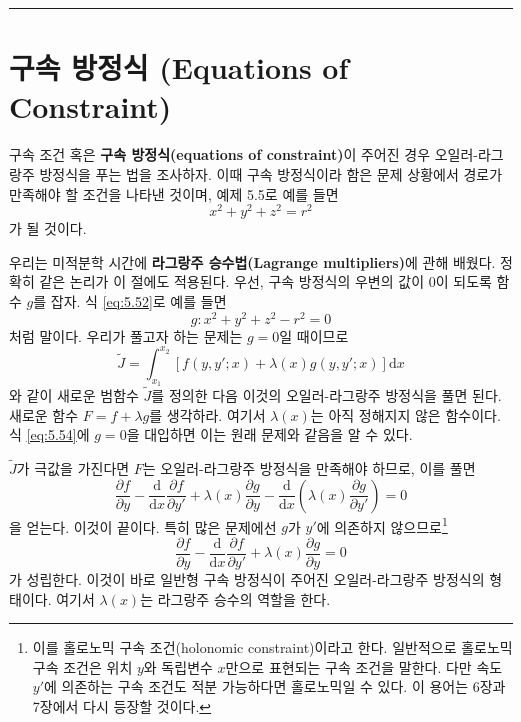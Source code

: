\documentclass[chapter, oneside, b5paper]{oblivoir}
\theoremstyle{plain}
\theoremstyle{definition}
\theoremstyle{remark}
\begin{document}
\noindent\rule{\textwidth}{0.8pt} %
\vspace{1em} %

\section{구속 방정식 (Equations of Constraint)}
구속 조건 혹은 \textbf{구속 방정식(equations of constraint)}이 주어진 경우 오일러-라그랑주 방정식을 푸는 법을 조사하자. 이때 구속 방정식이라 함은 문제 상황에서 경로가 만족해야 할 조건을 나타낸 것이며, 예제 5.5로 예를 들면
\begin{equation}
    x^2 + y^2+z^2 = r^2
    \label{eq:5.52}
\end{equation}
가 될 것이다.

우리는 미적분학 시간에 \textbf{라그랑주 승수법(Lagrange multipliers)}에 관해 배웠다. 정확히 같은 논리가 이 절에도 적용된다. 우선, 구속 방정식의 우변의 값이 0이 되도록 함수 $g$를 잡자. 식 \ref{eq:5.52}로 예를 들면
\begin{equation}
    g : x^2 + y^2 + z^2 - r^2 = 0
\end{equation}
처럼 말이다. 우리가 풀고자 하는 문제는 $g=0$일 때이므로 
\begin{equation}
    \tilde{J} = \int_{x_1}^{x_2} [f(y, y' ;x) + \lambda(x)g(y, y' ;x)] \mathrm{d}x
    \label{eq:5.54}
\end{equation}
와 같이 새로운 범함수 $\tilde{J}$를 정의한 다음 이것의 오일러-라그랑주 방정식을 풀면 된다. 새로운 함수 $F=f+\lambda g$를 생각하라. 여기서 $\lambda(x)$는 아직 정해지지 않은 함수이다. 식 \ref{eq:5.54}에 $g=0$을 대입하면 이는 원래 문제와 같음을 알 수 있다.

$\tilde{J}$가 극값을 가진다면 $F$는 오일러-라그랑주 방정식을 만족해야 하므로, 이를 풀면
\begin{equation}
    \frac{\partial f}{\partial y} - \frac{\mathrm{d}}{\mathrm{d}x}\frac{\partial f}{\partial y'} + \lambda(x)\frac{\partial g}{\partial y} - \frac{\mathrm{d}}{\mathrm{d}x} \left(\lambda(x)\frac{\partial g}{\partial y'} \right) = 0
\end{equation}
을 얻는다. 이것이 끝이다. 특히 많은 문제에선 $g$가 $y'$에 의존하지 않으므로\footnote{이를 홀로노믹 구속 조건(holonomic constraint)이라고 한다. 일반적으로 홀로노믹 구속 조건은 위치 $y$와 독립변수 $x$만으로 표현되는 구속 조건을 말한다. 다만 속도 $y'$에 의존하는 구속 조건도 적분 가능하다면 홀로노믹일 수 있다. 이 용어는 6장과 7장에서 다시 등장할 것이다.}
\begin{equation}
     \frac{\partial f}{\partial y} - \frac{\mathrm{d}}{\mathrm{d}x}\frac{\partial f}{\partial y'} + \lambda(x)\frac{\partial g}{\partial y} = 0 \label{eq:5.56}
\end{equation}
가 성립한다. 이것이 바로 일반형 구속 방정식이 주어진 오일러-라그랑주 방정식의 형태이다. 여기서 $\lambda(x)$는 라그랑주 승수의 역할을 한다.
\end{document}
